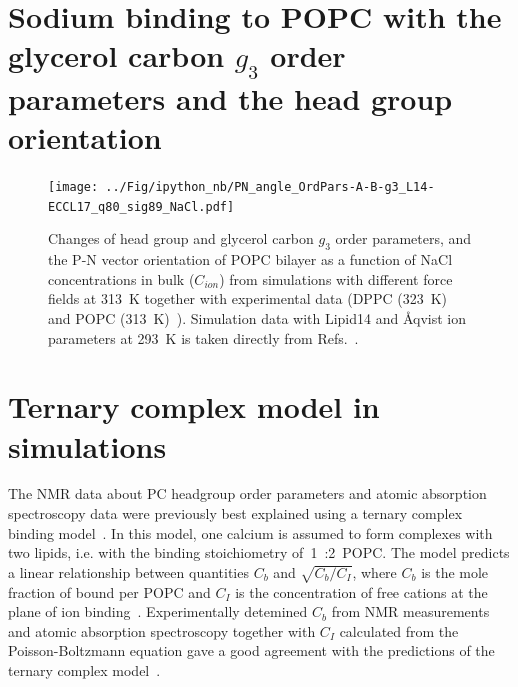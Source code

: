 \documentclass[journal=jpcbfk]{achemso}
\begin{document}
\newpage
\section{Sodium binding to POPC with the glycerol carbon $g_3$ order parameters and the head group orientation}

\begin{figure}[!h]
  \centering
  \texttt{[image: ../Fig/ipython\_nb/PN\_angle\_OrdPars-A-B-g3\_L14-ECCL17\_q80\_sig89\_NaCl.pdf]}
  \caption{\label{fig:delta_ordPar_NaCl_si}
    Changes of head group and glycerol carbon $g_3$ order parameters, and the P-N vector orientation of POPC bilayer
    as a function of NaCl concentrations in bulk ($C_{ion}$)
    from simulations with different force fields at 313~K together with experimental
    data (DPPC (323~K)~\cite{akutsu81} and POPC (313~K)~\cite{altenbach84}). 
    Simulation data with Lipid14 and \AA{}qvist ion parameters at 293~K is taken directly
    from Refs.~.
  }
\end{figure}

\newpage
\section{Ternary complex model in simulations}
The NMR data about PC headgroup order parameters
and atomic absorption spectroscopy data were previously
best explained using a ternary complex binding model~\cite{altenbach84}.
In this model, one calcium is assumed to form
complexes with two lipids, i.e. with the binding stoichiometry of~1~:2~POPC.
The model predicts a linear relationship between quantities 
$C_b$ and $\sqrt{C_b/C_I}$, where $C_b$ is the
mole fraction of bound  per POPC
and $C_I$ is the concentration of free cations at the plane of ion binding~\cite{altenbach84}.
Experimentally detemined $C_b$ %
from NMR measurements and atomic absorption spectroscopy %
together with $C_I$ calculated from the Poisson-Boltzmann equation
gave a good agreement with the predictions of the
ternary complex model~\cite{altenbach84}.
\end{document}
